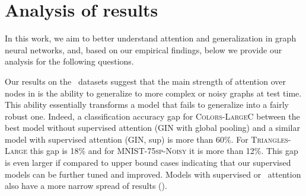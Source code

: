 \section{Analysis of results}
\label{sec:results}
In this work, we aim to better understand attention and generalization in graph neural networks, and,  based on our empirical findings, below we provide our analysis for the following questions.

Our results on the \synthetic~datasets suggest that the main strength of attention over nodes in \gnns is the ability to generalize to more complex or noisy graphs at test time. This ability essentially transforms a model that fails to generalize into a fairly robust one. Indeed, a classification accuracy gap for \textsc{Colors-LargeC} between the best model without supervised attention (GIN with global pooling) and a similar model with supervised attention (GIN, sup) is more than 60\%. For \textsc{Triangles-Large} this gap is 18\%  and for \textsc{MNIST-75sp-Noisy} it is more than 12\%. This gap is even larger if compared to upper bound cases indicating that our supervised models can be further tuned and improved. Models with supervised or \wsup~attention also have a more narrow spread of results (\fig{\ref{fig:accuracy_cos_sim}}).



